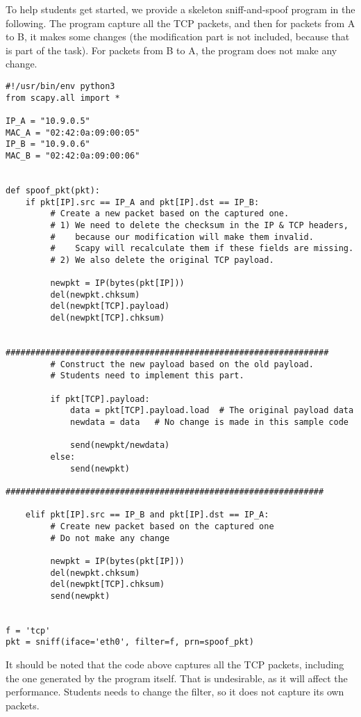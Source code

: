 To help students get started, we provide a skeleton sniff-and-spoof
program in the following. The program capture all the TCP packets, and 
then for packets from A to B, it makes some changes (the modification
part is not included, because that is part of the task). For packets from
B to A, the program does not make any change.  

\begin{lstlisting}
#!/usr/bin/env python3
from scapy.all import *

IP_A = "10.9.0.5"
MAC_A = "02:42:0a:09:00:05"
IP_B = "10.9.0.6"
MAC_B = "02:42:0a:09:00:06"


def spoof_pkt(pkt):
    if pkt[IP].src == IP_A and pkt[IP].dst == IP_B:
         # Create a new packet based on the captured one.
         # 1) We need to delete the checksum in the IP & TCP headers, 
         #    because our modification will make them invalid.
         #    Scapy will recalculate them if these fields are missing. 
         # 2) We also delete the original TCP payload.

         newpkt = IP(bytes(pkt[IP]))
         del(newpkt.chksum)
         del(newpkt[TCP].payload)
         del(newpkt[TCP].chksum)

         #################################################################
         # Construct the new payload based on the old payload.
         # Students need to implement this part.

         if pkt[TCP].payload:
             data = pkt[TCP].payload.load  # The original payload data
             newdata = data   # No change is made in this sample code

             send(newpkt/newdata)
         else:
             send(newpkt)
         ################################################################

    elif pkt[IP].src == IP_B and pkt[IP].dst == IP_A:
         # Create new packet based on the captured one 
         # Do not make any change 

         newpkt = IP(bytes(pkt[IP]))
         del(newpkt.chksum)
         del(newpkt[TCP].chksum)
         send(newpkt)


f = 'tcp'
pkt = sniff(iface='eth0', filter=f, prn=spoof_pkt)
\end{lstlisting}


It should be noted that the code above captures all the TCP 
packets, including the one generated by the program itself. That is 
undesirable, as it will affect
the performance. Students needs to change the filter, so it does not capture 
its own packets. 



